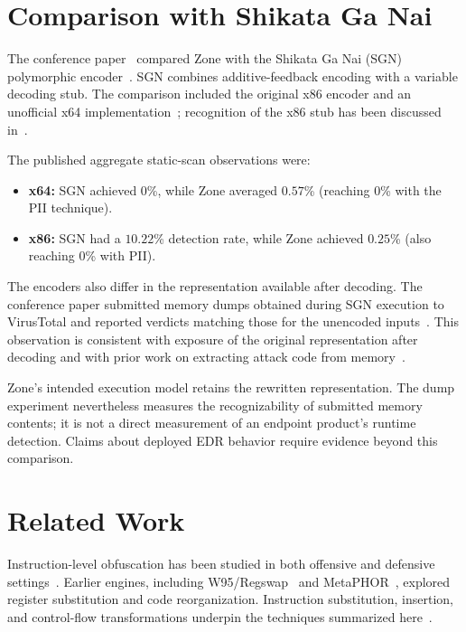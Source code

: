 \documentclass[runningheads]{llncs}
\begin{document}
\section{Comparison with Shikata Ga Nai}\label{sec:comparison}

The conference paper~\cite{zone_secrypt_2026} compared Zone with the Shikata Ga Nai (SGN) polymorphic encoder~\cite{sgnarticle}. SGN combines additive-feedback encoding with a variable decoding stub. The comparison included the original x86 encoder and an unofficial x64 implementation~\cite{sgn64}; recognition of the x86 stub has been discussed in~\cite{sgnstrong}.

The published aggregate static-scan observations were:

\begin{itemize}
    \item \textbf{x64:} SGN achieved $0$\%, while Zone averaged $0.57$\% (reaching $0$\% with the PII technique).
    \item \textbf{x86:} SGN had a $10.22$\% detection rate, while Zone achieved $0.25$\% (also reaching $0$\% with PII).
\end{itemize}

The encoders also differ in the representation available after decoding. The conference paper submitted memory dumps obtained during SGN execution to VirusTotal and reported verdicts matching those for the unencoded inputs~\cite{zone_secrypt_2026}. This observation is consistent with exposure of the original representation after decoding and with prior work on extracting attack code from memory~\cite{codeExtraction}.

Zone's intended execution model retains the rewritten representation. The dump experiment nevertheless measures the recognizability of submitted memory contents; it is not a direct measurement of an endpoint product's runtime detection. Claims about deployed EDR behavior require evidence beyond this comparison.







\section{Related Work}\label{sect:related_work}
Instruction-level obfuscation has been studied in both offensive and defensive settings~\cite{survey1,survey2}. Earlier engines, including W95/Regswap~\cite{desai2010highly} and MetaPHOR~\cite{MetaPHOR}, explored register substitution and code reorganization. Instruction substitution, insertion, and control-flow transformations underpin the techniques summarized here~\cite{desai2008towards,desai2010highly,szor2001hunting,bin2binobf,llvmobf}.
\end{document}
